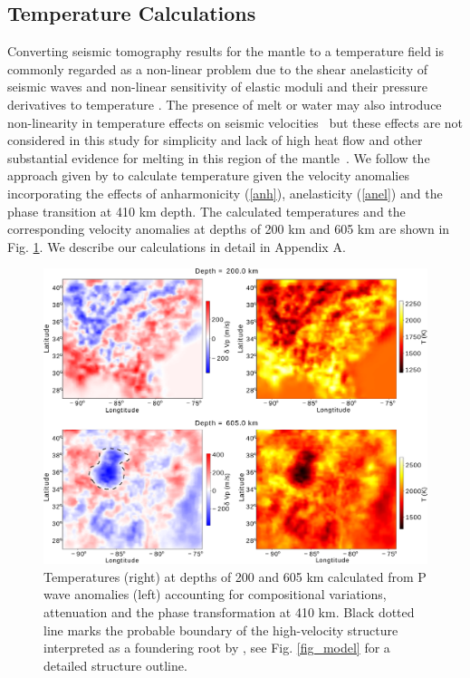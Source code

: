 \documentclass[draft,linenumbers]{agujournal2018}
\begin{document}
\subsection{Temperature Calculations} \label{temp_var}
     Converting seismic tomography results for the mantle to a temperature field is commonly regarded as a non-linear problem due to the shear anelasticity of seismic waves \citep{minster1981model, karato1993importance, sobolev1996upper, Goes_2000, artemieva2004shear} and non-linear sensitivity of elastic moduli and their pressure derivatives to temperature \citep{duffy1989seismic, anderson1992high, Cammarano2003, stixrude2005thermodynamics}. The presence of melt or water may also introduce non-linearity in temperature effects on seismic velocities~\citep{Karato_1998} but these effects are not considered in this study for simplicity and lack of high heat flow and other substantial evidence for melting in this region of the  mantle~\citep{blackwell2006assessment}. We follow the approach given by \citet{Cammarano2003} to calculate temperature given the velocity anomalies incorporating the effects of anharmonicity  (\ref{anh}), anelasticity (\ref{anel}) and the phase transition at 410 km depth. The calculated temperatures and the corresponding velocity anomalies at depths of 200 km and 605 km are shown in Fig. \ref{fig_temp}. We describe our calculations in detail in Appendix A. 
%
\begin{figure}[ht]
    \centering
    \includegraphics[width=0.75\linewidth]{figures/figure_temp.png}
    \caption{Temperatures (right) at depths of 200 and 605 km calculated from P wave anomalies (left) accounting for compositional variations, attenuation and the phase transformation at 410 km. Black dotted line marks the probable boundary of the high-velocity structure interpreted as a foundering root by \citet{Biryol_2016}, see Fig. \ref{fig_model} for a detailed structure outline.}
    \label{fig_temp}
 \end{figure}
\end{document}
